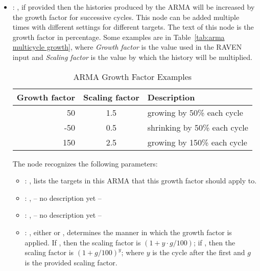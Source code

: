 \begin{itemize}
\begin{itemize}
        \item {}: , 
          if provided then the histories produced by
          the ARMA will be increased by the growth factor for successive cycles. This node can be
          added                                                    multiple times with different
          settings for different targets.                                                    The
          text of this node is the growth factor in percentage. Some examples are in
          Table~\ref{tab:arma multicycle growth}, where \emph{Growth factor} is the value used in
          the RAVEN                                                    input and \emph{Scaling
          factor} is the value by which the history will be multiplied.
          \begin{table}[h!]                                                      \centering
          \begin{tabular}{r c l}                                                        Growth
          factor & Scaling factor & Description \\ \hline
          50 & 1.5 & growing by 50\% each cycle \\
          -50 & 0.5 & shrinking by 50\% each cycle \\
          150 & 2.5 & growing by 150\% each cycle \\
          \end{tabular}                                                      \caption{ARMA Growth
          Factor Examples}                                                      \label{tab:arma
          multicycle growth}                                                    \end{table}
          The  node recognizes the following parameters:
            \begin{itemize}
              \item {}: , 
                lists the targets                     in this ARMA that this growth factor should
                apply to.
              \item {}: , 
                -- no description yet --
              \item {}: , 
                -- no description yet --
              \item {}: , 
                either  or                     , determines
                the manner in which the growth factor is applied.                     If
                , then the scaling factor is $(1+y\cdot g/100)$;
                if , then the scaling factor is $(1+g/100)^y$;
                where $y$ is the cycle after the first and $g$ is the provided scaling factor.
          \end{itemize}
      \end{itemize}


\end{itemize}
